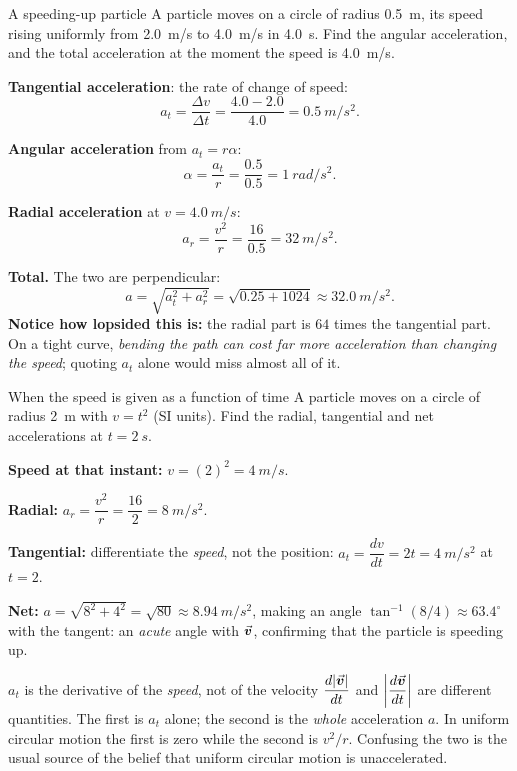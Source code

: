 \begin{exbox}{A speeding-up particle}
A particle moves on a circle of radius \SI{0.5}{m}, its speed rising uniformly from \SI{2.0}{m/s} to
\SI{4.0}{m/s} in \SI{4.0}{s}. Find the angular acceleration, and the total acceleration at the moment the
speed is \SI{4.0}{m/s}.

 \textbf{Tangential acceleration}: the rate of change of speed:
\[
a_t=\frac{\Delta v}{\Delta t}=\frac{4.0-2.0}{4.0}=\SI{0.5}{m/s^2}.
\]

 \textbf{Angular acceleration} from $a_t=r\alpha$:
\[
\alpha=\frac{a_t}{r}=\frac{0.5}{0.5}=\SI{1}{rad/s^2}.
\]

 \textbf{Radial acceleration} at $v=\SI{4.0}{m/s}$:
\[
a_r=\frac{v^{2}}{r}=\frac{16}{0.5}=\SI{32}{m/s^2}.
\]

 \textbf{Total.} The two are perpendicular:
\[
a=\sqrt{a_t^{2}+a_r^{2}}=\sqrt{0.25+1024}\approx\SI{32.0}{m/s^2}.
\]
\textbf{Notice how lopsided this is:} the radial part is $64$ times the tangential part. On a tight
curve, \emph{bending the path can cost far more acceleration than changing the speed}; quoting $a_t$
alone would miss almost all of it.
\end{exbox}

\begin{exbox}{When the speed is given as a function of time}
A particle moves on a circle of radius \SI{2}{m} with $v=t^{2}$ (SI units). Find the radial, tangential
and net accelerations at $t=\SI{2}{s}$.

 \textbf{Speed at that instant:} $v=(2)^{2}=\SI{4}{m/s}$.

 \textbf{Radial:} $a_r=\dfrac{v^{2}}{r}=\dfrac{16}{2}=\SI{8}{m/s^2}$.

 \textbf{Tangential:} differentiate the \emph{speed}, not the position:
$a_t=\dfrac{dv}{dt}=2t=\SI{4}{m/s^2}$ at $t=2$.

 \textbf{Net:} $a=\sqrt{8^{2}+4^{2}}=\sqrt{80}\approx\SI{8.94}{m/s^2}$, making an angle
$\tan^{-1}(8/4)\approx63.4^\circ$ with the tangent: an \emph{acute} angle with $\vec{\bm{v}}$, confirming that
the particle is speeding up. 
\end{exbox}

\begin{trapbox}{$a_t$ is the derivative of the \emph{speed}, not of the velocity}
$\dfrac{d|\vec{\bm{v}}|}{dt}$ and $\left|\dfrac{d\vec{\bm{v}}}{dt}\right|$ are different quantities. The first is $a_t$
alone; the second is the \emph{whole} acceleration $a$. In uniform circular motion the first is zero
while the second is $v^{2}/r$. Confusing the two is the usual source of the belief that uniform
circular motion is unaccelerated.
\end{trapbox}

